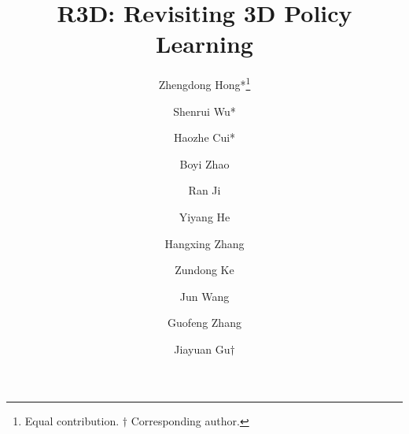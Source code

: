 \documentclass[runningheads]{llncs}
\begin{document}
\title{R3D: Revisiting 3D Policy Learning\vspace{-9pt}} 



\author{Zhengdong Hong*\thanks{Equal contribution. $\dagger$ Corresponding author.}\and
Shenrui Wu*\and
Haozhe Cui*\and
Boyi Zhao\and
Ran Ji\and
Yiyang He\and
Hangxing Zhang\and
Zundong Ke\and
Jun Wang\and
Guofeng Zhang\and
Jiayuan Gu$\dagger$
}


\maketitle
\end{document}
